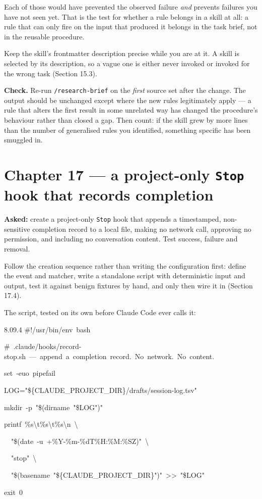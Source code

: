 \documentclass[11pt,a4paper,twoside,openany]{book}
\newcommand{\cl}[1]{\noindent\mbox{#1}\par}
\begin{document}
Each of those would have prevented the observed failure \emph{and} prevents failures you have not seen yet. That is the test for whether a rule belongs in a skill at all: a rule that can only fire on the input that produced it belongs in the task brief, not in the reusable procedure.


Keep the skill's frontmatter description precise while you are at it. A skill is selected by its description, so a vague one is either never invoked or invoked for the wrong task (Section 15.3).


\textbf{Check.} Re-run \texttt{/\allowbreak{}research-\allowbreak{}brief} on the \emph{first} source set after the change. The output should be unchanged except where the new rules legitimately apply — a rule that alters the first result in some unrelated way has changed the procedure's behaviour rather than closed a gap. Then count: if the skill grew by more lines than the number of generalised rules you identified, something specific has been smuggled in.


\FloatBarrier
\section*{Chapter 17 — a project-only \texttt{Stop} hook that records completion}

\textbf{Asked:} create a project-only \texttt{Stop} hook that appends a timestamped, non-sensitive completion record to a local file, making no network call, approving no permission, and including no conversation content. Test success, failure and removal.


Follow the creation sequence rather than writing the configuration first: define the event and matcher, write a standalone script with deterministic input and output, test it against benign fixtures by hand, and only then wire it in (Section 17.4).


The script, tested on its own before Claude Code ever calls it:


\begin{codeblock}{8.0}{9.4}
\cl{\#!/usr/bin/env~bash}
\cl{\#~.claude/hooks/record-stop.sh~—~append~a~completion~record.~No~network.~No~content.}
\cl{set~-euo~pipefail}
\cl{LOG="\$\{CLAUDE\_PROJECT\_DIR\}/drafts/session-log.tsv"}
\cl{mkdir~-p~"\$(dirname~"\$LOG")"}
\cl{printf~\textquotesingle{}\%s\textbackslash{}t\%s\textbackslash{}t\%s\textbackslash{}n\textquotesingle{}~\textbackslash{}}
\cl{~~"\$(date~-u~+\%Y-\%m-\%dT\%H:\%M:\%SZ)"~\textbackslash{}}
\cl{~~"stop"~\textbackslash{}}
\cl{~~"\$(basename~"\$\{CLAUDE\_PROJECT\_DIR\}")"~>>~"\$LOG"}
\cl{exit~0}
\end{codeblock}
\end{document}
